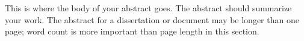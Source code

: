 This is where the body of your abstract goes. 
The abstract should summarize your work. 
The abstract for a dissertation or document may be longer than one page; word count is more important than page length in this section.
